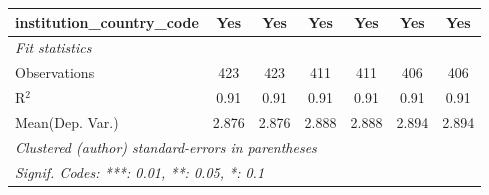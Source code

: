\begin{tabular}{lcccccc}
   institution\_country\_code         & Yes    & Yes     & Yes    & Yes     & Yes    & Yes\\  
   \midrule
   \emph{Fit statistics}\\
   Observations                       & 423    & 423     & 411    & 411     & 406    & 406\\  
   R$^2$                              & 0.91   & 0.91    & 0.91   & 0.91    & 0.91   & 0.91\\  
Mean(Dep. Var.) & 2.876 & 2.876 & 2.888 & 2.888 & 2.894 & 2.894 \\
   \midrule \midrule
   \multicolumn{7}{l}{\emph{Clustered (author) standard-errors in parentheses}}\\
   \multicolumn{7}{l}{\emph{Signif. Codes: ***: 0.01, **: 0.05, *: 0.1}}\\
\end{tabular}
\par\endgroup
